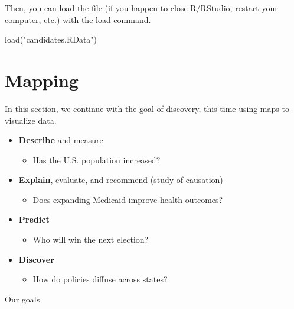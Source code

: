 \documentclass[
  letterpaper,
  DIV=11,
  numbers=noendperiod]{scrreprt}
\newenvironment{Shaded}{\begin{snugshade}}{\end{snugshade}}
\newcommand{\FunctionTok}[1]{\textcolor[rgb]{0.28,0.35,0.67}{#1}}
\newcommand{\NormalTok}[1]{\textcolor[rgb]{0.00,0.23,0.31}{#1}}
\newcommand{\StringTok}[1]{\textcolor[rgb]{0.13,0.47,0.30}{#1}}
\providecommand{\tightlist}{%
  \setlength{\itemsep}{0pt}\setlength{\parskip}{0pt}}\usepackage{longtable,booktabs,array}
\begin{document}
Then, you can load the file (if you happen to close R/RStudio, restart
your computer, etc.) with the load command.

\begin{Shaded}
\begin{Highlighting}[]
\FunctionTok{load}\NormalTok{(}\StringTok{"candidates.RData"}\NormalTok{)}
\end{Highlighting}
\end{Shaded}


\hypertarget{maps}{%
\chapter{Mapping}\label{maps}}

In this section, we continue with the goal of discovery, this time using
maps to visualize data.

\begin{itemize}
\tightlist
\item
  \textbf{Describe} and measure

  \begin{itemize}
  \tightlist
  \item
    Has the U.S. population increased?
  \end{itemize}
\item
  \textbf{Explain}, evaluate, and recommend (study of causation)

  \begin{itemize}
  \tightlist
  \item
    Does expanding Medicaid improve health outcomes?
  \end{itemize}
\item
  \textbf{Predict}

  \begin{itemize}
  \tightlist
  \item
    Who will win the next election?
  \end{itemize}
\item
  \textbf{Discover}

  \begin{itemize}
  \tightlist
  \item
    How do policies diffuse across states?
  \end{itemize}
\end{itemize}

Our goals
\end{document}
